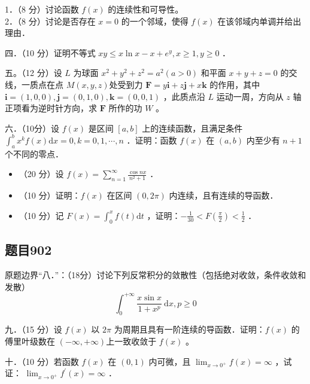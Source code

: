 \documentclass{article}
\begin{document}
1．（8 分）讨论函数 \(f(x)\) 的连续性和可导性。\\

2．（8 分）讨论是否存在 \(x=0\) 的一个邻域，使得 \(f(x)\) 在该邻域内单调并给出理由．

四．（10 分）证明不等式 \(x y \leq x \ln x-x+e^{y}, x \geq 1, y \geq 0\) ．

五。（12 分）设 \(L\) 为球面 \(x^{2}+y^{2}+z^{2}=a^{2}(a>0)\) 和平面 \(x+y+z=0\) 的交线，一质点在点 \(M(x, y, z)\)处受到力 \(\mathbf{F}=y \mathbf{i}+z \mathbf{j}+x \mathbf{k}\) 的作用，其中 \(\mathbf{i}=(1,0,0), \mathbf{j}=(0,1,0), \mathbf{k}=(0,0,1)\) ，此质点沿 \(L\) 运动一周，方向从 \(z\) 轴正项看为逆时针方向，求 \(\mathbf{F}\) 所作的功 \(W\) 。

六．（10分）设 \(f(x)\) 是区间 \([a, b]\) 上的连续函数，且满足条件 \(\int_{a}^{b} x^{k} f(x) \mathrm{d} x=0, k=0,1, \cdots, n\) ．证明：函数 \(f(x)\) 在 \((a, b)\) 内至少有 \(n+1\) 个不同的零点．

\begin{itemize}
  \item[七．] （20 分）设 \(f(x)=\sum_{n=1}^{\infty} \frac{\cos n x}{n^{2}+1}\) ．

  \item[1．] （10 分）证明：\(f(x)\) 在区间 \((0,2 \pi)\) 内连续，且有连续的导函数．

  \item[2．] （10 分）记 \(F(x)=\int_{0}^{x} f(t) \mathrm{d} t\) ，证明：\(-\frac{1}{30}<F\left(\frac{\pi}{2}\right)<\frac{1}{2}\) ．
\end{itemize}

\subsection{题目902}
原题边界“八．”：（18分）讨论下列反常积分的敛散性（包括绝对收敛，条件收敛和发散）
\[
\int_{0}^{+\infty} \frac{x \sin x}{1+x^{p}} \mathrm{~d} x, p \geq 0
\]

九．（15 分）设 \(f(x)\) 以 \(2 \pi\) 为周期且具有一阶连续的导函数．证明：\(f(x)\) 的傅里叶级数在 \((-\infty,+\infty)\)上一致收敛于 \(f(x)\) 。

十．（10 分）若函数 \(f(x)\) 在 \((0,1)\) 内可微，且 \(\lim _{x \rightarrow 0^{+}} f(x)=\infty\) ，试证： \(\lim _{x \rightarrow 0^{+}} f^{\prime}(x)=\infty\) ．
\end{document}
